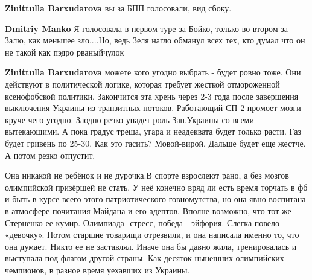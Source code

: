 \begin{itemize}
\begin{itemize}
\textbf{Zinittulla Barxudarova} вы за БПП голосовали, вид сбоку.

 
\textbf{Dmitriy Manko} Я голосовала в первом туре за Бойко, только во втором за Залю, как меньшее зло....Но, ведь Зеля нагло обманул всех тех, кто думал что он не такой как пэдро рваныйчулок

 
\textbf{Zinittulla Barxudarova} можете кого угодно выбрать - будет ровно тоже. Они действуют в политической логике, которая требует жесткой отмороженной ксенофобской политики. Закончится эта хрень через 2-3 года после завершения выключения Украины из транзитных потоков. Работающий СП-2 промоет мозги круче чего угодно. Заодно резко упадет роль Зап.Украины со всеми вытекающими. А пока градус треша, угара и неадеквата будет только расти. Газ будет гривень по 25-30. Как это гасить? Мовой-вирой. Дальше будет еще жестче. А потом резко отпустит.
\end{itemize}

 

Она никакой не ребёнок и не дурочка.В спорте взрослеют рано, а без мозгов
олимпийской призёршей не стать. У неё конечно вряд ли есть время торчать в фб и
быть в курсе всего этого патриотического говномутства, но она явно воспитана в
атмосфере почитания Майдана и его адептов. Вполне возможно, что тот же
Стерненко ее кумир. Олимпиада -стресс, победа - эйфория. Слегка повело
«девочку». Потом старшие товарищи отрезвили, и она написала именно то, что она
думает. Никто ее не заставлял. Иначе она бы давно жила, тренировалась и
выступала под флагом другой страны. Как десяток нынешних олимпийских чемпионов,
в разное время уехавших из Украины.


 



\end{itemize}
